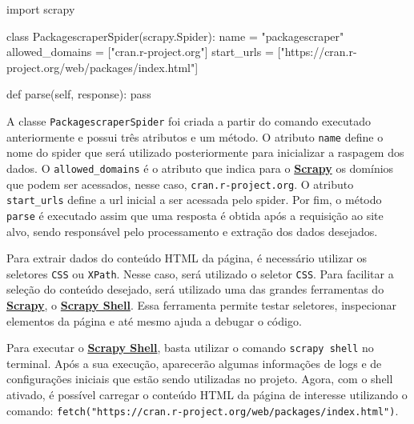 \documentclass[
  12pt,
  a4paper,
]{scrreprt}
\newenvironment{Shaded}{}{}
\newcommand{\ControlFlowTok}[1]{\textcolor[rgb]{0.84,0.23,0.29}{#1}}
\newcommand{\ImportTok}[1]{\textcolor[rgb]{0.01,0.18,0.38}{#1}}
\newcommand{\KeywordTok}[1]{\textcolor[rgb]{0.84,0.23,0.29}{#1}}
\newcommand{\NormalTok}[1]{\textcolor[rgb]{0.14,0.16,0.18}{#1}}
\newcommand{\OperatorTok}[1]{\textcolor[rgb]{0.14,0.16,0.18}{#1}}
\newcommand{\StringTok}[1]{\textcolor[rgb]{0.01,0.18,0.38}{#1}}
\newcommand{\VariableTok}[1]{\textcolor[rgb]{0.89,0.38,0.04}{#1}}
\begin{document}
\begin{Shaded}
\begin{Highlighting}[]
\ImportTok{import}\NormalTok{ scrapy}


\KeywordTok{class}\NormalTok{ PackagescraperSpider(scrapy.Spider):}
\NormalTok{    name }\OperatorTok{=} \StringTok{"packagescraper"}
\NormalTok{    allowed\_domains }\OperatorTok{=}\NormalTok{ [}\StringTok{"cran.r{-}project.org"}\NormalTok{]}
\NormalTok{    start\_urls }\OperatorTok{=}\NormalTok{ [}\StringTok{"https://cran.r{-}project.org/web/packages/index.html"}\NormalTok{]}

    \KeywordTok{def}\NormalTok{ parse(}\VariableTok{self}\NormalTok{, response):}
        \ControlFlowTok{pass}
\end{Highlighting}
\end{Shaded}

A classe \texttt{PackagescraperSpider} foi criada a partir do comando
executado anteriormente e possui três atributos e um método. O atributo
\texttt{name} define o nome do spider que será utilizado posteriormente
para inicializar a raspagem dos dados. O \texttt{allowed\_domains} é o
atributo que indica para o
\href{https://docs.scrapy.org/en/latest}{\textbf{Scrapy}} os domínios
que podem ser acessados, nesse caso, \texttt{cran.r-project.org}. O
atributo \texttt{start\_urls} define a url inicial a ser acessada pelo
spider. Por fim, o método \texttt{parse} é executado assim que uma
resposta é obtida após a requisição ao site alvo, sendo responsável pelo
processamento e extração dos dados desejados.

\vspace{12pt}

Para extrair dados do conteúdo HTML da página, é necessário utilizar os
seletores \texttt{CSS} ou \texttt{XPath}. Nesse caso, será utilizado o
seletor \texttt{CSS}. Para facilitar a seleção do conteúdo desejado,
será utilizado uma das grandes ferramentas do
\href{https://docs.scrapy.org/en/latest}{\textbf{Scrapy}}, o
\href{https://docs.scrapy.org/en/latest/topics/shell.html}{\textbf{Scrapy
Shell}}. Essa ferramenta permite testar seletores, inspecionar elementos
da página e até mesmo ajuda a debugar o código.

\vspace{12pt}

Para executar o
\href{https://docs.scrapy.org/en/latest/topics/shell.html}{\textbf{Scrapy
Shell}}, basta utilizar o comando \texttt{scrapy\ shell} no terminal.
Após a sua execução, aparecerão algumas informações de logs e de
configurações iniciais que estão sendo utilizadas no projeto. Agora, com
o shell ativado, é possível carregar o conteúdo HTML da página de
interesse utilizando o comando:
\texttt{fetch("https://cran.r-project.org/web/packages/index.html")}.
\end{document}
